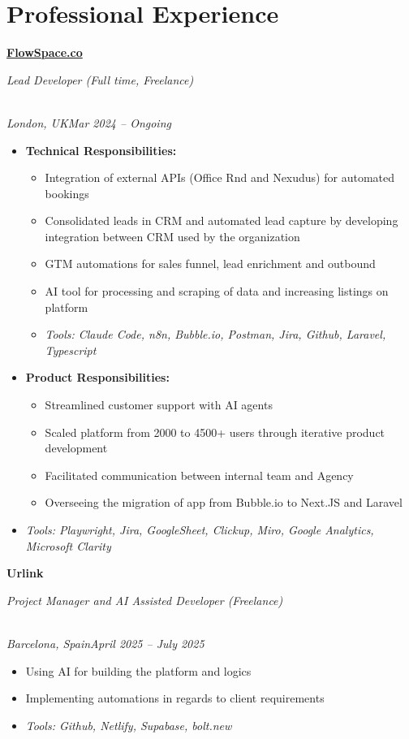 \documentclass[a4paper,10pt]{article}
\newcommand{\role}[4]{\vspace{3pt}\noindent\hspace{0.6em}\parbox[t]{0.38\textwidth}{\raggedright\textbf{#1}}\hfill\parbox[t]{0.58\textwidth}{\raggedleft\textit{#2}}\\{\textit{#3}\hfill\textit{#4}}\vspace{1pt}}
\begin{document}
\section{Professional Experience}
\role{\href{https://flowspace.co}{FlowSpace.co}}{Lead Developer (Full time, Freelance)}{London, UK}{Mar 2024 -- Ongoing}
\begin{itemize}
\item \textbf{Technical Responsibilities:}
\begin{itemize}[label=--]
\item Integration of external APIs (Office Rnd and Nexudus) for automated bookings
\item Consolidated leads in CRM and automated lead capture by developing integration between CRM used by the organization
\item GTM automations for sales funnel, lead enrichment and outbound
\item AI tool for processing and scraping of data and increasing listings on platform
\item \textit{Tools: Claude Code, n8n, Bubble.io, Postman, Jira, Github, Laravel, Typescript}
\end{itemize}
\item \textbf{Product Responsibilities:}
\begin{itemize}[label=--]
\item Streamlined customer support with AI agents
\item Scaled platform from 2000 to 4500+ users through iterative product development
\item Facilitated communication between internal team and Agency
\item Overseeing the migration of app from Bubble.io to Next.JS and Laravel
\end{itemize}
\item \textit{Tools: Playwright, Jira, GoogleSheet, Clickup, Miro, Google Analytics, Microsoft Clarity}
\end{itemize}

\role{Urlink}{Project Manager and AI Assisted Developer (Freelance)}{Barcelona, Spain}{April 2025 -- July 2025}
\begin{itemize}
\item Using AI for building the platform and logics
\item Implementing automations in regards to client requirements
\item \textit{Tools: Github, Netlify, Supabase, bolt.new}
\end{itemize}
\end{document}
